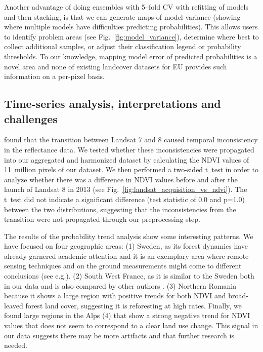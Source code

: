 Another advantage of doing ensembles with 5--fold CV with refitting of models and then stacking, is that we can generate maps of model variance (showing where multiple models have difficulties predicting probabilities). This allows users to identify problem areas (see Fig.\@~\ref{fig:model_variance}), determine where best to collect additional samples, or adjust their classification legend or probability thresholds. To our knowledge, mapping model error of predicted probabilities is a novel area and none of existing landcover datasets for EU provides such information on a per-pixel basis.



\subsection*{Time-series analysis, interpretations and challenges}
    
    
\citet{palahi2021concerns} found that the transition between Landsat 7 and 8 caused temporal inconsistency in the reflectance data. We tested whether these inconsistencies were propagated into our aggregated and harmonized dataset by calculating the NDVI values of 11~million pixels of our dataset. We then performed a two-sided t~test in order to analyze whether there was a difference in NDVI values before and after the launch of Landsat 8 in 2013 (see Fig.\@~\ref{fig:landsat_acquisition_vs_ndvi}). The t~test did not indicate a significant difference (test statistic of 0.0 and p=1.0) between the two distributions, suggesting that the inconsistencies from the transition were not propagated through our preprocessing step. 
    
The results of the probability trend analysis show some interesting patterns. We have focused on four geographic areas: (1) Sweden, as its forest dynamics have already garnered academic attention and it is an exemplary area where remote sensing techniques and on the ground measurements might come to different conclusions (see e.g.\@ \citet{ceccherini2020abrupt}). (2) South West France, as it is similar to the Sweden both in our data and is also compared by other authors \citep{senf2021mapping}. (3) Northern Romania because it shows a large region with positive trends for both NDVI and broad-leaved forest land cover, suggesting it is reforesting at high rates. Finally, we found large regions in the Alps (4) that show a strong negative trend for NDVI values that does not seem to correspond to a clear land use change. This signal in our data suggests there may be more artifacts and that further research is needed.
    
